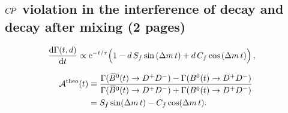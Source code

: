 
\subsection{\texorpdfstring{${C\!P}$}{CP} violation in the interference of decay and decay after mixing (2 pages)}
\label{sec:cpviolation:types:interference}

\begin{equation}
\begin{aligned}
  \frac{\mathrm{d}\Gamma(t,d)}{\mathrm{d}t}
  &\propto \mathrm{e}^{-t/\tau}
    \Big(
      1
      - d\, \Sf \sin{\left(\dm\,t\right)}
      + d\, \Cf \cos{\left(\dm\,t\right)}
    \Big)\,,
\end{aligned}
\label{eq:cpviolation:simpledecayrates}
\end{equation}

\begin{equation}
\begin{split}
  {\mathcal A}^{\text{theo}}(t) & \equiv
    \frac{\Gamma({{\kern 0.18em\overline{\kern -0.18em B}{}}{}^0}(t) \rightarrow {\ensuremath{{D}^+}}{\ensuremath{{D}^-}}) - \Gamma({{B}^0}(t) \rightarrow {\ensuremath{{D}^+}}{\ensuremath{{D}^-}})}
         {\Gamma({{\kern 0.18em\overline{\kern -0.18em B}{}}{}^0}(t) \rightarrow {\ensuremath{{D}^+}}{\ensuremath{{D}^-}}) + \Gamma({{B}^0}(t) \rightarrow {\ensuremath{{D}^+}}{\ensuremath{{D}^-}})}\\
   &= S_{f}\sin({\Delta m}\,t) - C_{f}\cos({\Delta m}\,t).\
\end{split}
\label{eq:cpviolation:asymmetry}
\end{equation}